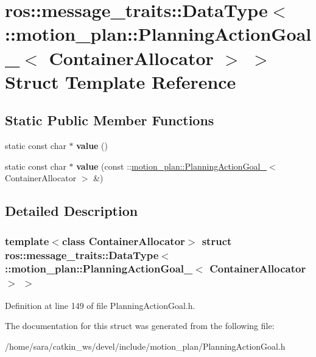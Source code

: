 \hypertarget{structros_1_1message__traits_1_1DataType_3_01_1_1motion__plan_1_1PlanningActionGoal___3_01ContainerAllocator_01_4_01_4}{}\section{ros\+:\+:message\+\_\+traits\+:\+:Data\+Type$<$ \+:\+:motion\+\_\+plan\+:\+:Planning\+Action\+Goal\+\_\+$<$ Container\+Allocator $>$ $>$ Struct Template Reference}
\label{structros_1_1message__traits_1_1DataType_3_01_1_1motion__plan_1_1PlanningActionGoal___3_01ContainerAllocator_01_4_01_4}
\subsection*{Static Public Member Functions}
\begin{DoxyCompactItemize}
\item 
\mbox{\label{structros_1_1message__traits_1_1DataType_3_01_1_1motion__plan_1_1PlanningActionGoal___3_01ContainerAllocator_01_4_01_4_a856c7d8c698aa8afa00381cf9f8742a2}} 
static const char $\ast$ {\bfseries value} ()
\item 
\mbox{\label{structros_1_1message__traits_1_1DataType_3_01_1_1motion__plan_1_1PlanningActionGoal___3_01ContainerAllocator_01_4_01_4_a20f38d7d1e450c7e27f28a78de81a6d8}} 
static const char $\ast$ {\bfseries value} (const \+::\hyperlink{structmotion__plan_1_1PlanningActionGoal__}{motion\+\_\+plan\+::\+Planning\+Action\+Goal\+\_\+}$<$ Container\+Allocator $>$ \&)
\end{DoxyCompactItemize}


\subsection{Detailed Description}
\subsubsection*{template$<$class Container\+Allocator$>$\newline
struct ros\+::message\+\_\+traits\+::\+Data\+Type$<$ \+::motion\+\_\+plan\+::\+Planning\+Action\+Goal\+\_\+$<$ Container\+Allocator $>$ $>$}



Definition at line 149 of file Planning\+Action\+Goal.\+h.



The documentation for this struct was generated from the following file\+:\begin{DoxyCompactItemize}
\item 
/home/sara/catkin\+\_\+ws/devel/include/motion\+\_\+plan/Planning\+Action\+Goal.\+h\end{DoxyCompactItemize}
